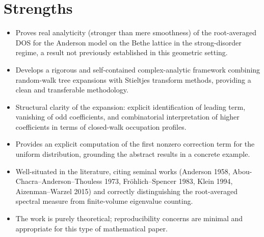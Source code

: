 \documentclass[11pt]{article}
\begin{document}
\section*{Strengths}
\begin{itemize}[leftmargin=*]
  \item Proves real analyticity (stronger than mere smoothness) of the root-averaged DOS for the Anderson model on the Bethe lattice in the strong-disorder regime, a result not previously established in this geometric setting.
  \item Develops a rigorous and self-contained complex-analytic framework combining random-walk tree expansions with Stieltjes transform methods, providing a clean and transferable methodology.
  \item Structural clarity of the expansion: explicit identification of leading term, vanishing of odd coefficients, and combinatorial interpretation of higher coefficients in terms of closed-walk occupation profiles.
  \item Provides an explicit computation of the first nonzero correction term for the uniform distribution, grounding the abstract results in a concrete example.
  \item Well-situated in the literature, citing seminal works (Anderson 1958, Abou-Chacra–Anderson–Thouless 1973, Fröhlich–Spencer 1983, Klein 1994, Aizenman–Warzel 2015) and correctly distinguishing the root-averaged spectral measure from finite-volume eigenvalue counting.
  \item The work is purely theoretical; reproducibility concerns are minimal and appropriate for this type of mathematical paper.
\end{itemize}
\end{document}
